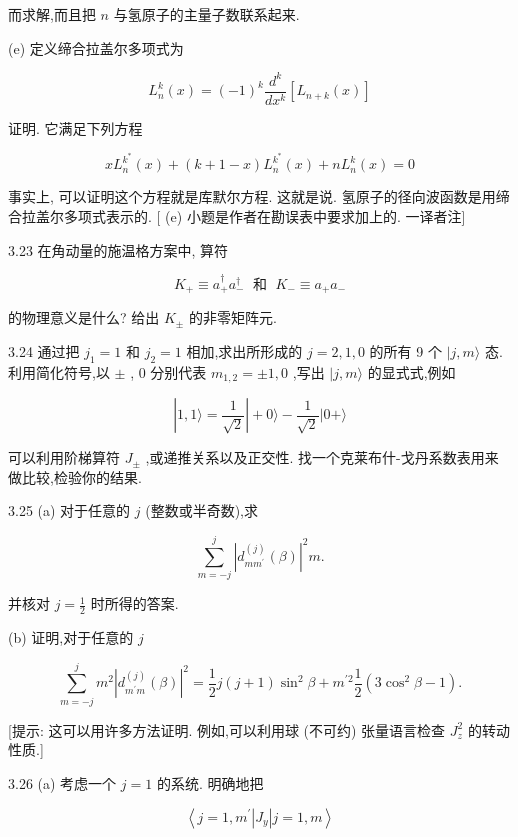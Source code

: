 而求解,而且把 $n$ 与氢原子的主量子数联系起来.

(e) 定义缔合拉盖尔多项式为

$$
{L}_{n}^{k}\left( x\right) = {\left( -1\right) }^{k}\frac{{d}^{k}}{d{x}^{k}}\left\lbrack {{L}_{n + k}\left( x\right) }\right\rbrack
$$

证明. 它满足下列方程

$$
x{L}_{n}^{{k}^{ * }}\left( x\right) + \left( {k + 1 - x}\right) {L}_{n}^{{k}^{ * }}\left( x\right) + n{L}_{n}^{k}\left( x\right) = 0
$$

事实上, 可以证明这个方程就是库默尔方程. 这就是说. 氢原子的径向波函数是用缔合拉盖尔多项式表示的. [ (e) 小题是作者在勘误表中要求加上的. 一译者注]

3.23 在角动量的施温格方案中, 算符

$$
{K}_{ + } \equiv {a}_{ + }^{ \dagger }{a}_{ - }^{ \dagger }\;\text{ 和 }\;{K}_{ - } \equiv {a}_{ + }{a}_{ - }
$$

的物理意义是什么? 给出 ${K}_{ \pm }$ 的非零矩阵元.

3.24 通过把 ${j}_{1} = 1$ 和 ${j}_{2} = 1$ 相加,求出所形成的 $j = 2,1,0$ 的所有 9 个 $|j, m\rangle$ 态. 利用简化符号,以 $\pm$ , 0 分别代表 ${m}_{1,2} = \pm 1,0$ ,写出 $|j, m\rangle$ 的显式式,例如

$$
\left| {1,1\rangle = \frac{1}{\sqrt{2}}}\right| + 0\rangle - \frac{1}{\sqrt{2}}|0 + \rangle
$$

可以利用阶梯算符 ${J}_{ \pm }$ ,或递推关系以及正交性. 找一个克莱布什-戈丹系数表用来做比较,检验你的结果.

3.25 (a) 对于任意的 $j$ (整数或半奇数),求

$$
\mathop{\sum }\limits_{{m = - j}}^{j}{\left| {d}_{m{m}^{\prime }}^{\left( j\right) }\left( \beta \right) \right| }^{2}m.
$$

并核对 $j = \frac{1}{2}$ 时所得的答案.

(b) 证明,对于任意的 $j$

$$
\mathop{\sum }\limits_{{m = - j}}^{j}{m}^{2}{\left| {d}_{{m}^{\prime }m}^{\left( j\right) }\left( \beta \right) \right| }^{2} = \frac{1}{2}j\left( {j + 1}\right) {\sin }^{2}\beta + {m}^{\prime 2}\frac{1}{2}\left( {3{\cos }^{2}\beta - 1}\right) .
$$

[提示: 这可以用许多方法证明. 例如,可以利用球 (不可约) 张量语言检查 ${J}_{z}^{2}$ 的转动性质.]

3.26 (a) 考虑一个 $j = 1$ 的系统. 明确地把

$$
\left\langle {j = 1,{m}^{\prime }\left| {J}_{y}\right| j = 1, m}\right\rangle
$$

